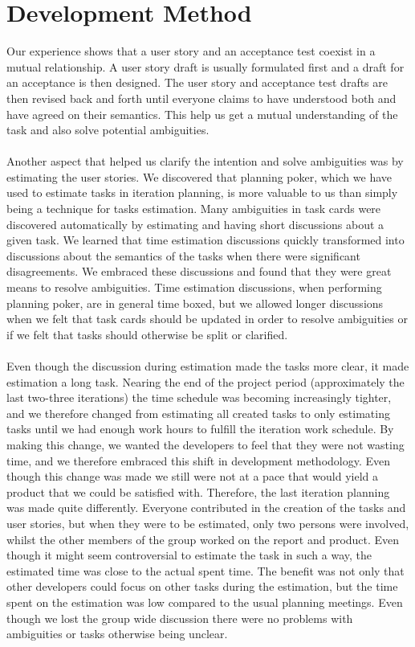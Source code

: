 
\section{Development Method}
Our experience shows that a user story and an acceptance test coexist in a mutual relationship. A user story draft is usually formulated first and a draft for an acceptance is then designed. The user story and acceptance test drafts are then revised back and forth until everyone claims to have understood both and have agreed on their semantics. This help us get a mutual understanding of the task and also solve potential ambiguities. 
\\\\
Another aspect that helped us clarify the intention and solve ambiguities was by estimating the user stories. 
We discovered that planning poker, which we have used to estimate tasks in iteration planning, is more valuable to us than simply being a technique for tasks estimation. Many ambiguities in task cards were discovered automatically by estimating and having short discussions about a given task. We learned that time estimation discussions quickly transformed into discussions about the semantics of the tasks when there were significant disagreements. We embraced these discussions and found that they were great means to resolve ambiguities. Time estimation discussions, when performing planning poker, are in general time boxed, but we allowed longer discussions when we felt that task cards should be updated in order to resolve ambiguities or if we felt that tasks should otherwise be split or clarified.
\\\\
Even though the discussion during estimation made the tasks more clear, it made estimation a long task. Nearing the end of the project period (approximately the last two-three iterations) the time schedule was becoming increasingly tighter, and we therefore changed from estimating all created tasks to only estimating tasks until we had enough work hours to fulfill the iteration work schedule. By making this change, we wanted the developers to feel that they were not wasting time, and we therefore embraced this shift in development methodology. Even though this change was made we still were not at a pace that would yield a product that we could be satisfied with. Therefore, the last iteration planning was made quite differently. Everyone contributed in the creation of the tasks and user stories, but when they were to be estimated, only two persons were involved, whilst the other members of the group worked on the report and product. Even though it might seem controversial to estimate the task in such a way, the estimated time was close to the actual spent time. The benefit was not only that other developers could focus on other tasks during the estimation, but the time spent on the estimation was low compared to the usual planning meetings. Even though we lost the group wide discussion there were no problems with ambiguities or tasks otherwise being unclear. 
